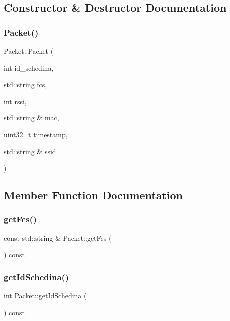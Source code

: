 \subsection{Constructor \& Destructor Documentation}
\mbox{\label{class_packet_a2de1c15db947aa3b1e91e1aec8168357}} 
\subsubsection{\texorpdfstring{Packet()}{Packet()}}
{\footnotesize\ttfamily Packet\+::\+Packet (\begin{DoxyParamCaption}\item[{int}]{id\+\_\+schedina,  }\item[{std\+::string}]{fcs,  }\item[{int}]{rssi,  }\item[{std\+::string \&}]{mac,  }\item[{uint32\+\_\+t}]{timestamp,  }\item[{std\+::string \&}]{ssid }\end{DoxyParamCaption})}



\subsection{Member Function Documentation}
\mbox{\label{class_packet_aefc0b0eb863a800079b82b5491cc313c}} 
\subsubsection{\texorpdfstring{get\+Fcs()}{getFcs()}}
{\footnotesize\ttfamily const std\+::string \& Packet\+::get\+Fcs (\begin{DoxyParamCaption}{ }\end{DoxyParamCaption}) const}

\mbox{\label{class_packet_a958820970e1756ad312c30a0bf76ef42}} 
\subsubsection{\texorpdfstring{get\+Id\+Schedina()}{getIdSchedina()}}
{\footnotesize\ttfamily int Packet\+::get\+Id\+Schedina (\begin{DoxyParamCaption}{ }\end{DoxyParamCaption}) const}

